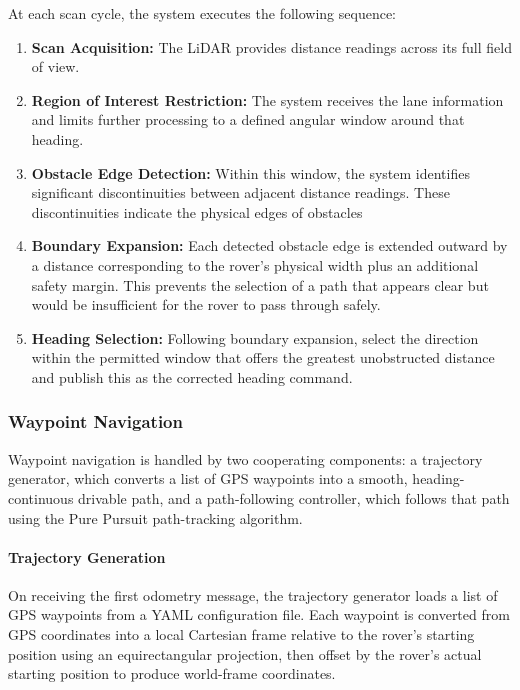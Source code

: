 \documentclass[12pt,a4paper,twocolumn]{article}
\begin{document}
At each scan cycle, the system executes the following sequence:
\begin{enumerate}
    \setlength{\itemsep}{1pt}
    \setlength{\parskip}{0pt}
    \setlength{\parsep}{0pt}
    \item \textbf{Scan Acquisition:} The LiDAR provides distance readings across its full field of view.
    \item \textbf{Region of Interest Restriction:} The system receives the lane information and limits further processing to a defined angular window around that heading.
    \item \textbf{Obstacle Edge Detection:} Within this window, the system identifies significant discontinuities between adjacent distance readings. These discontinuities indicate the physical edges of obstacles
    \item \textbf{Boundary Expansion:} Each detected obstacle edge is extended outward by a distance corresponding to the rover's physical width plus an additional safety margin. This prevents the selection of a path that appears clear but would be insufficient for the rover to pass through safely.
    \item \textbf{Heading Selection:} Following boundary expansion, select the direction within the permitted window that offers the greatest unobstructed distance and publish this as the corrected heading command.
\end{enumerate}
\subsubsection{Waypoint Navigation}
Waypoint navigation is handled by two cooperating components: a trajectory generator, which converts a list of GPS waypoints into a smooth, heading-continuous drivable path, and a path-following controller, which follows that path using the Pure Pursuit path-tracking algorithm.

\paragraph{Trajectory Generation}
On receiving the first odometry message, the trajectory generator loads a list of GPS waypoints from a YAML configuration file. Each waypoint is converted from GPS coordinates into a local Cartesian frame relative to the rover's starting position using an equirectangular projection, then offset by the rover's actual starting position to produce world-frame coordinates.
\end{document}

